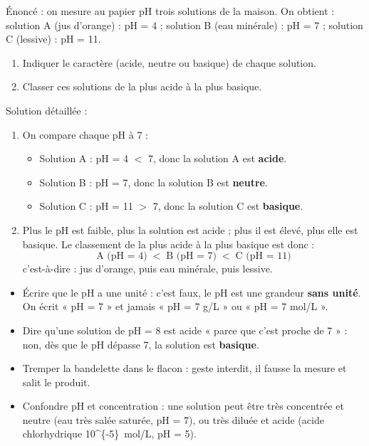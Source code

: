 \documentclass[11pt]{article}
\begin{document}
\begin{exoresolu}
Énoncé : on mesure au papier pH trois solutions de la maison. On obtient : solution A (jus d'orange) : pH = 4 ; solution B (eau minérale) : pH = 7 ; solution C (lessive) : pH = 11.
\begin{enumerate}
\item Indiquer le caractère (acide, neutre ou basique) de chaque solution.
\item Classer ces solutions de la plus acide à la plus basique.
\end{enumerate}
\tcblower
Solution détaillée :
\begin{enumerate}
\item On compare chaque pH à 7 :
\begin{itemize}
\item Solution A : pH = 4 $<$ 7, donc la solution A est \textbf{acide}.
\item Solution B : pH = 7, donc la solution B est \textbf{neutre}.
\item Solution C : pH = 11 $>$ 7, donc la solution C est \textbf{basique}.
\end{itemize}
\item Plus le pH est faible, plus la solution est acide ; plus il est élevé, plus elle est basique. Le classement de la plus acide à la plus basique est donc :
\[ \text{A (pH = 4)} \;<\; \text{B (pH = 7)} \;<\; \text{C (pH = 11)} \]
c'est-à-dire : jus d'orange, puis eau minérale, puis lessive.
\end{enumerate}
\end{exoresolu}

\begin{attention}
\begin{itemize}
\item Écrire que le pH a une unité : c'est faux, le pH est une grandeur \textbf{sans unité}. On écrit « pH = 7 » et jamais « pH = 7 g/L » ou « pH = 7 mol/L ».
\item Dire qu'une solution de pH = 8 est acide « parce que c'est proche de 7 » : non, dès que le pH dépasse 7, la solution est \textbf{basique}.
\item Tremper la bandelette dans le flacon : geste interdit, il fausse la mesure et salit le produit.
\item Confondre pH et concentration : une solution peut être très concentrée et neutre (eau très salée  saturée, pH = 7), ou très diluée et acide (acide chlorhydrique \SI{10^{-5}}{mol/L}, pH = 5).
\end{itemize}
\end{attention}
\end{document}
